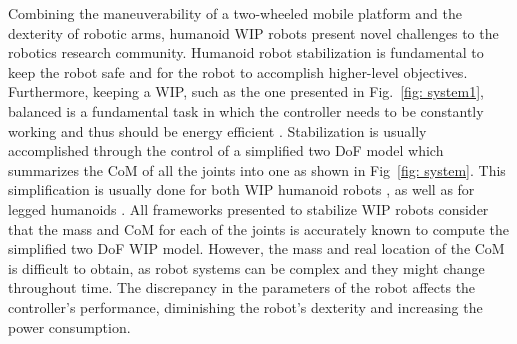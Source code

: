 \documentclass[letterpaper, 10 pt, conference]{ieeeconf}
\newcommand{\Bogdan}[1]{\textcolor{red}{\textbf{Bogdan:} #1}}
\begin{document}
Combining the maneuverability of a two-wheeled mobile platform and the dexterity
of robotic arms, humanoid \ac{WIP} robots present novel challenges to the
robotics research community.
Humanoid robot stabilization is fundamental to keep the robot safe and for the
robot to accomplish higher-level objectives.
Furthermore, keeping a \ac{WIP}, such as the one presented in Fig.~\ref{fig:
system1}, balanced is a fundamental task in which the controller needs to be
constantly working and thus should be energy efficient \cite{Bature2014}.
Stabilization is usually accomplished through the control of a simplified two
\ac{DoF} model which summarizes the \ac{CoM} of all the joints into one as shown
in Fig~\ref{fig: system}. This simplification is usually done for both \ac{WIP}
humanoid robots \cite{Zafar2016,canete2012disturbance, takei2009baggage}, as
well as for legged humanoids \cite{Carpentier2016, Muscolo2011, Kudruss2015}.
All frameworks presented to stabilize \ac{WIP} robots consider that the mass and
\ac{CoM} for each of the joints is accurately known
\cite{SangJoo2007,Sihite2018,Pajon2017} to compute the simplified two \ac{DoF}
WIP model. However, the mass and real location of the \ac{CoM} is difficult to
obtain, as robot systems can be complex and they might change throughout time.
The discrepancy in the parameters of the robot affects the controller's
performance, diminishing the robot's dexterity and increasing the power
consumption.
\end{document}
